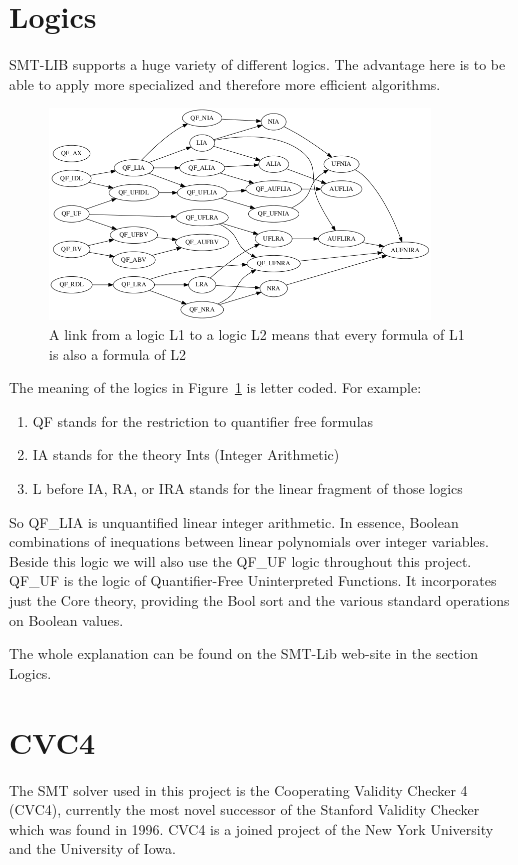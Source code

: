 \section{Logics}
SMT-LIB supports a huge variety of different logics. The advantage here is to be able to apply more specialized and therefore more efficient algorithms.
\begin{figure}
  \centering
  \includegraphics[width=0.9\textwidth]{Pictures/logics.png}  
  \caption{A link from a logic L1 to a logic L2 means that every formula of L1 is also a formula of L2}
  \label{fig:logics}
\end{figure}
The meaning of the logics in Figure~\ref{fig:logics} is letter coded. For example:
\begin{enumerate}
  \item QF stands for the restriction to quantifier free formulas
  \item IA stands for the theory Ints (Integer Arithmetic)
  \item L before IA, RA, or IRA stands for the linear fragment of those logics 
\end{enumerate}
So QF\_LIA is unquantified linear integer arithmetic. In essence, Boolean combinations of inequations between linear polynomials over integer variables. Beside this logic we will also use the QF\_UF logic throughout this project. QF\_UF is the logic of Quantifier-Free Uninterpreted Functions. It incorporates just the Core theory, providing the Bool sort and the various standard operations on Boolean values.
 
The whole explanation can be found on the SMT-Lib web-site in the section Logics.

\section{CVC4}
The SMT solver used in this project is the Cooperating Validity Checker 4 (CVC4), currently the most novel  successor of the Stanford Validity Checker which was found in 1996. CVC4 is a joined project of the New York University and the University of Iowa.

